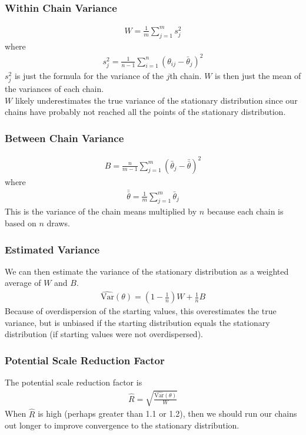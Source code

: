 \documentclass[handout]{beamer}
\begin{document}
\begin{frame}
\frametitle{Within Chain Variance}
\pause
\begin{eqnarray*}
W = \frac{1}{m} \sum_{j=1}^m s^2_j
\end{eqnarray*} 
where
\begin{eqnarray*}
s^2_j = \frac{1}{n-1} \sum_{i=1}^n (\theta_{ij} - \bar{\theta}_j)^2
\end{eqnarray*}
\pause
$s^2_j$ is just the formula for the variance of the $j$th chain.
\pause  $W$ is then just the mean of the variances of each chain.\\
\pause
\bigskip
$W$ likely underestimates the true variance of the stationary distribution
since our chains have probably not reached all the points of the
stationary distribution.
\end{frame}

\begin{frame}
\frametitle{Between Chain Variance}
\pause
\begin{eqnarray*}
B = \frac{n}{m-1} \sum_{j=1}^m (\bar{\theta}_j - \bar{\bar{\theta}})^2
\end{eqnarray*}
where
\begin{eqnarray*}
\bar{\bar{\theta}} = \frac{1}{m} \sum_{j=1}^m \bar{\theta}_j
\end{eqnarray*}
\pause
This is the variance of the chain means multiplied by $n$ because each
chain is based on $n$ draws.
\end{frame}

\begin{frame}
\frametitle{Estimated Variance}
\pause
We can then estimate the variance of the stationary distribution as a
weighted average of $W$ and $B$.
\pause
\begin{eqnarray*}
\hat{\mathrm{Var}}(\theta) = (1-\frac{1}{n}) W + \frac{1}{n} B
\end{eqnarray*}
\pause
Because of overdispersion of the starting values, this overestimates
the true variance, but is unbiased if the starting distribution equals
the stationary distribution (if starting values were not overdispersed).
\end{frame}

\begin{frame}
\frametitle{Potential Scale Reduction Factor}
\pause
The potential scale reduction factor is
\begin{eqnarray*}
\hat{R} = \sqrt{\frac{\hat{\mathrm{Var}}(\theta)}{W}}
\end{eqnarray*}
\pause
When $\hat{R}$ is high (perhaps greater than 1.1 or 1.2), then we
should run our chains out longer to improve convergence to the
stationary distribution.
\end{frame}
\end{document}
